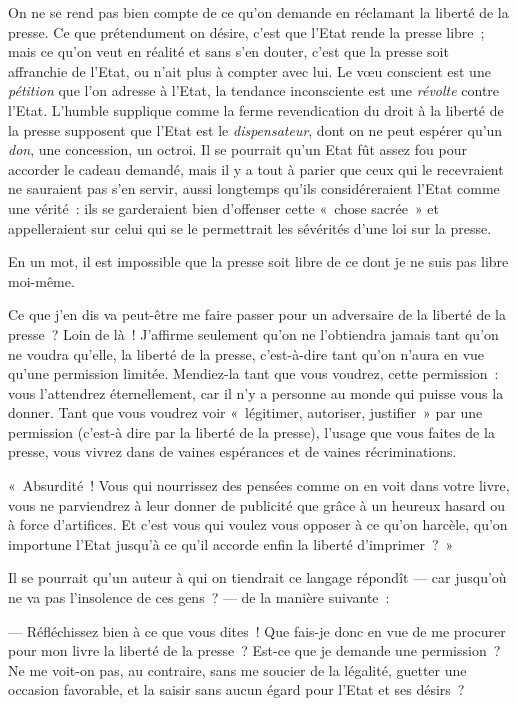 \documentclass[french,twoside]{book} %
\begin{document}
On ne se rend pas bien compte de ce qu’on demande en réclamant la liberté de la presse. Ce que prétendument on désire, c’est que l’Etat rende la presse libre ; mais ce qu’on veut en réalité et sans  s’en douter, c’est que la presse soit affranchie de l’Etat, ou n’ait plus à compter avec lui. Le vœu conscient est une \emph{pétition} que l’on adresse à l’Etat, la tendance inconsciente est une \emph{révolte} contre l’Etat. L’humble supplique comme la ferme revendication du droit à la liberté de la presse supposent que l’Etat est le \emph{dispensateur}, dont on ne peut espérer qu’un \emph{don}, une concession, un octroi. Il se pourrait qu’un Etat fût assez fou pour accorder le cadeau demandé, mais il y a tout à parier que ceux qui le recevraient ne sauraient pas s’en servir, aussi longtemps qu’ils considéreraient l’Etat comme une vérité : ils se garderaient bien d’offenser cette « chose sacrée » et appelleraient sur celui qui se le permettrait les sévérités d’une loi sur la presse.\par
En un mot, il est impossible que la presse soit libre de ce dont je ne suis pas libre moi-même.\par
Ce que j’en dis va peut-être me faire passer pour un adversaire de la liberté de la presse ? Loin de là ! J’affirme seulement qu’on ne l’obtiendra jamais tant qu’on ne voudra qu’elle, la liberté de la presse, c’est-à-dire tant qu’on n’aura en vue qu’une permission limitée. Mendiez-la tant que vous voudrez, cette permission : vous l’attendrez éternellement, car il n’y a personne au monde qui puisse vous la donner. Tant que vous voudrez voir « légitimer, autoriser, justifier » par une permission (c’est-à dire par la liberté de la presse), l’usage que vous faites de la presse, vous vivrez dans de vaines espérances et de vaines récriminations.\par
« Absurdité ! Vous qui nourrissez des pensées comme on en voit dans votre livre, vous ne parviendrez à leur donner de publicité que grâce à un heureux hasard ou à force d’artifices. Et c’est vous qui voulez vous opposer à ce qu’on harcèle, qu’on importune l’Etat jusqu’à ce qu’il accorde enfin la liberté d’imprimer ? »\par
Il se pourrait qu’un auteur à qui on tiendrait ce  langage répondît — car jusqu’où ne va pas l’insolence de ces gens ? — de la manière suivante :\par
— Réfléchissez bien à ce que vous dites ! Que fais-je donc en vue de me procurer pour mon livre la liberté de la presse ? Est-ce que je demande une permission ? Ne me voit-on pas, au contraire, sans me soucier de la légalité, guetter une occasion favorable, et la saisir sans aucun égard pour l’Etat et ses désirs ?\par
\end{document}
